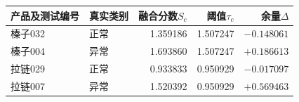 \begin{tabular}{llrrr}
\toprule
产品及测试编号&真实类别&融合分数$S_c$&阈值$\tau_c$&余量$\Delta$\\
\midrule
榛子032&正常&1.359186&1.507247&$-0.148061$\\
榛子004&异常&1.693860&1.507247&$+0.186613$\\
拉链029&正常&0.933833&0.950929&$-0.017097$\\
拉链007&异常&1.520392&0.950929&$+0.569463$\\
\bottomrule
\end{tabular}
